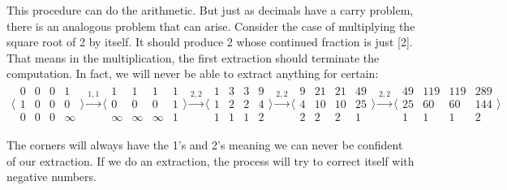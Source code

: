 \documentclass[12pt]{article}
\begin{document}
This procedure can do the arithmetic. But just as decimals have a carry problem, there is an analogous problem that can arise. Consider the case of multiplying the square root of 2 by itself. It should produce 2 whose continued fraction is just [2]. That means in the multiplication, the first extraction should terminate the computation. In fact, we will never be able to extract anything for certain: 
\begin{multline*}
 \big\langle\begin{smallmatrix}
  0 & 0 & 0 & 1\\
  1 & 0 & 0 & 0\\
  0 & 0 & 0 & \infty
\end{smallmatrix}\big\rangle
\xrightarrow{1, 1}
 \big\langle\begin{smallmatrix}
  1 & 1 & 1 & 1\\
  0 & 0 & 0 & 1\\
  \infty & \infty & \infty & 1
\end{smallmatrix}\big\rangle
\xrightarrow{2, 2}
 \big\langle\begin{smallmatrix}
  1 & 3 & 3 & 9\\
  1 & 2 & 2 & 4\\
  1 & 1 & 1 & 2
\end{smallmatrix}\big\rangle
\xrightarrow{2, 2}
 \big\langle\begin{smallmatrix}
  9 & 21 & 21 & 49\\
  4 & 10 & 10 & 25\\
  2 & 2 & 2 & 1
\end{smallmatrix}\big\rangle
\xrightarrow{2, 2}
 \big\langle\begin{smallmatrix}
  49 & 119 & 119 & 289\\
  25 & 60 & 60 & 144\\
  1 & 1 & 1 & 2
\end{smallmatrix}\big\rangle
\end{multline*}

The corners will always have the 1's and 2's meaning we can never be confident of our extraction. If we do an extraction, the process will try to correct itself with negative numbers. 
\end{document}
